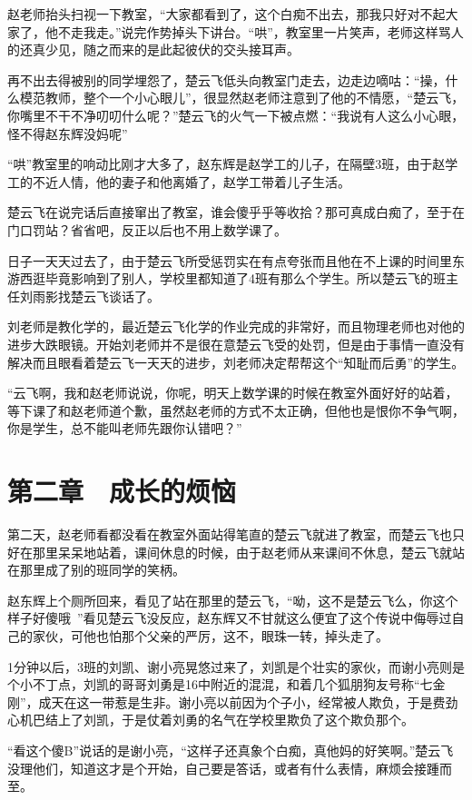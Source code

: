 赵老师抬头扫视一下教室，“大家都看到了，这个白痴不出去，那我只好对不起大家了，他不走我走。”说完作势掉头下讲台。“哄”，教室里一片笑声，老师这样骂人的还真少见，随之而来的是此起彼伏的交头接耳声。

再不出去得被别的同学埋怨了，楚云飞低头向教室门走去，边走边嘀咕：“操，什么模范教师，整个一个小心眼儿”，很显然赵老师注意到了他的不情愿，“楚云飞，你嘴里不干不净叨叨什么呢？”楚云飞的火气一下被点燃：“我说有人这么小心眼，怪不得赵东辉没妈呢”

“哄”教室里的响动比刚才大多了，赵东辉是赵学工的儿子，在隔壁3班，由于赵学工的不近人情，他的妻子和他离婚了，赵学工带着儿子生活。

楚云飞在说完话后直接窜出了教室，谁会傻乎乎等收拾？那可真成白痴了，至于在门口罚站？省省吧，反正以后也不用上数学课了。

日子一天天过去了，由于楚云飞所受惩罚实在有点夸张而且他在不上课的时间里东游西逛毕竟影响到了别人，学校里都知道了4班有那么个学生。所以楚云飞的班主任刘雨影找楚云飞谈话了。

刘老师是教化学的，最近楚云飞化学的作业完成的非常好，而且物理老师也对他的进步大跌眼镜。开始刘老师并不是很在意楚云飞受的处罚，但是由于事情一直没有解决而且眼看着楚云飞一天天的进步，刘老师决定帮帮这个“知耻而后勇”的学生。

“云飞啊，我和赵老师说说，你呢，明天上数学课的时候在教室外面好好的站着，等下课了和赵老师道个歉，虽然赵老师的方式不太正确，但他也是恨你不争气啊，你是学生，总不能叫老师先跟你认错吧？”

\section{第二章　成长的烦恼}

第二天，赵老师看都没看在教室外面站得笔直的楚云飞就进了教室，而楚云飞也只好在那里呆呆地站着，课间休息的时候，由于赵老师从来课间不休息，楚云飞就站在那里成了别的班同学的笑柄。

赵东辉上个厕所回来，看见了站在那里的楚云飞，“呦，这不是楚云飞么，你这个样子好傻哦~”看见楚云飞没反应，赵东辉又不甘就这么便宜了这个传说中侮辱过自己的家伙，可他也怕那个父亲的严厉，这不，眼珠一转，掉头走了。

1分钟以后，3班的刘凯、谢小亮晃悠过来了，刘凯是个壮实的家伙，而谢小亮则是个小不丁点，刘凯的哥哥刘勇是16中附近的混混，和着几个狐朋狗友号称“七金刚”，成天在这一带惹是生非。谢小亮以前因为个子小，经常被人欺负，于是费劲心机巴结上了刘凯，于是仗着刘勇的名气在学校里欺负了这个欺负那个。

“看这个傻B”说话的是谢小亮，“这样子还真象个白痴，真他妈的好笑啊。”楚云飞没理他们，知道这才是个开始，自己要是答话，或者有什么表情，麻烦会接踵而至。

